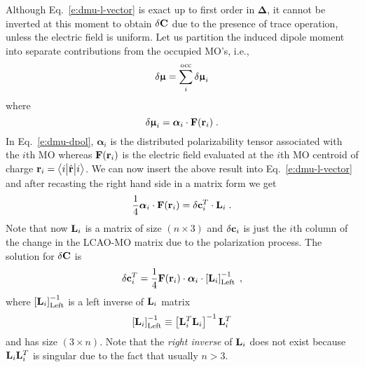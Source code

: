 \documentclass[aip,graphicx]{revtex4-1}
\newcommand{\tbraket}[3]{\ensuremath{\bigl\langle {#1} \bigl\lvert {#2} \bigl\lvert {#3} \bigr\rangle}}
\newcommand{\BM}[1]{\bm{#1}}
\begin{document}
Although Eq.~\eqref{e:dmu-l-vector}
is exact up to first order in ${\BM\Delta}$, it cannot be inverted at this moment to obtain $\delta {\bf C}$
due to the presence of trace operation, unless the electric field is uniform.
Let us partition the induced dipole moment into separate contributions
from the occupied MO's, i.e.,
%
\begin{equation} \label{e:dmu-part}
 \delta {\BM{\upmu}} = \sum_i^{\rm occ} \delta {\BM{\upmu}}_i
\end{equation}
%
where
%
\begin{equation} \label{e:dmu-dpol}
 \delta {\BM{\upmu}}_i = {\BM{\alpha}}_i \cdot {\bf F}({\bf r}_i) \;.
\end{equation}
%
In Eq.~\eqref{e:dmu-dpol}, ${\BM{\alpha}}_i$ is the distributed polarizability tensor
associated with the $i$th MO whereas ${\bf F}({\bf r}_i)$ is the electric field evaluated at the $i$th MO centroid of charge
${\bf r}_i = \tbraket{i}{\hat{\bf r}}{i}$.
We can now insert the above result into Eq.~\eqref{e:dmu-l-vector} 
and after recasting the right hand side in a matrix form
we get
%
\begin{equation} \label{e:dmu-l-vector-mo-transform-X}
 \frac{1}{4} {\BM{\alpha}}_i \cdot {\bf F}({\bf r}_i) 
   =
   \delta {\bf c}_i^T \cdot {\bf L}_i \;.
\end{equation}
%
Note that now ${\bf L}_i$ is a matrix of size $(n \times 3)$ and $\delta{\bf c}_i$ is just the $i$th column of the
change in the LCAO-MO matrix due to the polarization process.
%
%
The solution for $\delta {\bf C}$ is
%
\begin{equation} \label{e:mu-ind.matrix.linear.solution}
  \delta {\bf c}_i^T = \frac{1}{4}
            {\bf F}({\bf r}_i)  \cdot {\BM{\alpha}}_i \cdot 
                    \left[ {\bf L}_i  \right]^{-1}_{\rm Left} \;,
\end{equation}
%
where $\left[ {\bf L}_i  \right]^{-1}_{\rm Left}$ is a left inverse
of ${\bf L}_i$ matrix 
%
\begin{equation} 
      \left[ {\bf L}_i  \right]^{-1}_{\rm Left}   \equiv
       \left[ {\bf L}_i^T {\bf L}_i \right]^{-1} {\bf L}_i^T 
\end{equation}
%
and has size $(3\times n)$. Note that the \emph{right inverse} of ${\bf L}_i$
does not exist because ${\bf L}_i {\bf L}_i^T$ is singular due to the fact that usually
$n > 3$.
\end{document}
